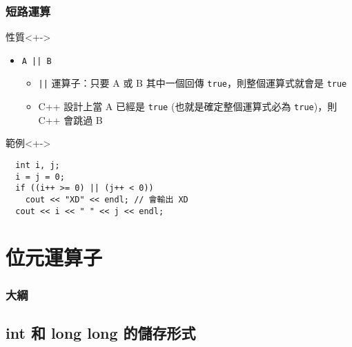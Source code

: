 \documentclass[utf8]{beamer}
\begin{document}
\begin{CJK}{UTF8}{bkai}
\begin{frame}[fragile]
  \frametitle{短路運算}
  \begin{block}{性質}<+->
    \begin{itemize}
    \item \lstinline{A || B}{}
      \begin{itemize}[<+->]
      \item \lstinline{||}{} 運算子：只要 A 或 B 其中一個回傳 \lstinline{true}{}，則整個運算式就會是 \lstinline{true}{}
      \item C++ 設計上當 A 已經是 \lstinline{true}{} (也就是確定整個運算式\alert{必為} \lstinline{true}{})，則 C++ 會\alert{跳過} B
      \end{itemize}
    \end{itemize}
  \end{block}
  \begin{exampleblock}{範例}<+->
    \begin{lstlisting}
  int i, j;
  i = j = 0;
  if ((i++ >= 0) || (j++ < 0))
    cout << "XD" << endl; // 會輸出 XD
  cout << i << " " << j << endl;
    \end{lstlisting}
  \end{exampleblock}
\end{frame}

\section{位元運算子}
\begin{frame}
  \frametitle{大綱}
  \begin{multicols}{2}
    \tableofcontents[currentsection]
  \end{multicols}
\end{frame}

\subsection{int 和 long long 的儲存形式}


\end{CJK}
\end{document}
